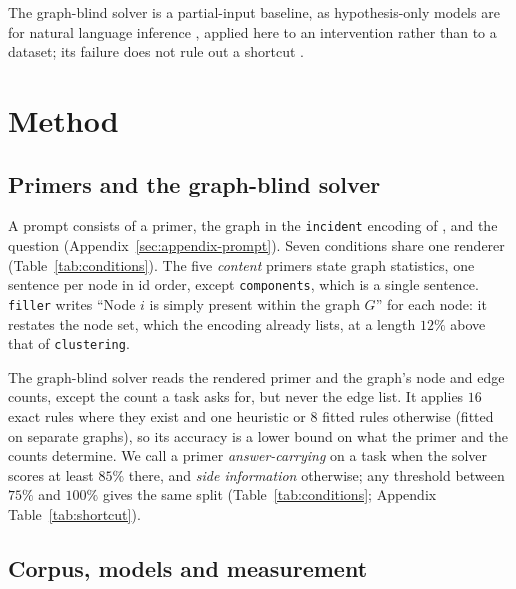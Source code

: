 \documentclass[11pt]{article}
\begin{document}
The graph-blind solver is a partial-input baseline, as hypothesis-only models
are for natural language inference
\citep{gururangan2018annotation,poliak2018hypothesis}, applied here to an
intervention rather than to a dataset; its failure does not rule out a
shortcut \citep{feng2019misleading}.

\section{Method}
\label{sec:method}

\subsection{Primers and the graph-blind solver}
\label{sec:primers}



A prompt consists of a primer, the graph in the \texttt{incident} encoding of
\citet{fatemi2023talklikeagraph}, and the question
(Appendix~\ref{sec:appendix-prompt}). Seven conditions share one renderer
(Table~\ref{tab:conditions}). The five \emph{content} primers state graph
statistics, one sentence per node in id order, except \texttt{components},
which is a single sentence. \texttt{filler} writes ``Node $i$ is simply present within the graph $G$'' for each node: it
restates the node set, which the encoding already lists, at a length $12\%$
above that of \texttt{clustering}.

The graph-blind solver reads the rendered primer and the graph's node and edge
counts, except the count a task asks for, but never the edge list. It applies
$16$ exact rules where they exist and one heuristic or $8$ fitted rules
otherwise (fitted on separate graphs), so its accuracy is a lower bound on
what the primer and the counts determine. We call a primer
\emph{answer-carrying} on a task when the solver scores at least $85\%$ there,
and \emph{side information} otherwise; any threshold between $75\%$ and
$100\%$ gives the same split (Table~\ref{tab:conditions}; Appendix
Table~\ref{tab:shortcut}).

\subsection{Corpus, models and measurement}
\label{sec:setup}


\end{document}

